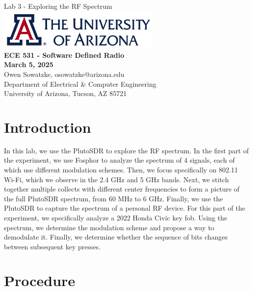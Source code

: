 \documentclass{article}
\begin{document}
\begin{titlepage}
	\centering
	{\huge Lab 3 - Exploring the RF Spectrum}\\[0.25 in]
	\includegraphics[width=0.6\textwidth]{ua_logo.png}\\[0.25 in]
	{\large \textbf{ECE 531 - Software Defined Radio\\[0.25 in]
	March 5, 2025\\[0.25 in]}}
	{\large Owen Sowatzke, osowatzke@arizona.edu\\[0.05 in]
	Department of Electrical \& Computer Engineering\\[0.05 in]
	University of Arizona, Tucson, AZ 85721\\[0.5 in]}
	\hypersetup{linkcolor=navy-blue}
	\noindent\hrulefill
	\tableofcontents
	\noindent\hrulefill
\end{titlepage}

\setlength{\parindent}{0pt}

\section{Introduction}

In this lab, we use the PlutoSDR to explore the RF spectrum. In the first part of the experiment, we use Fosphor to analyze the spectrum of 4 signals, each of which use different modulation schemes. Then, we focus specifically on 802.11 Wi-Fi, which we observe in the 2.4 GHz and 5 GHz bands. Next, we stitch together multiple collects with different center frequencies to form a picture of the full PlutoSDR spectrum, from 60 MHz to 6 GHz. Finally, we use the PlutoSDR to capture the spectrum of a personal RF device. For this part of the experiment, we specifically analyze a 2022 Honda Civic key fob. Using the spectrum, we determine the modulation scheme and propose a way to demodulate it. Finally, we determine whether the sequence of bits changes between subsequent key presses.

\section{Procedure}
\end{document}
